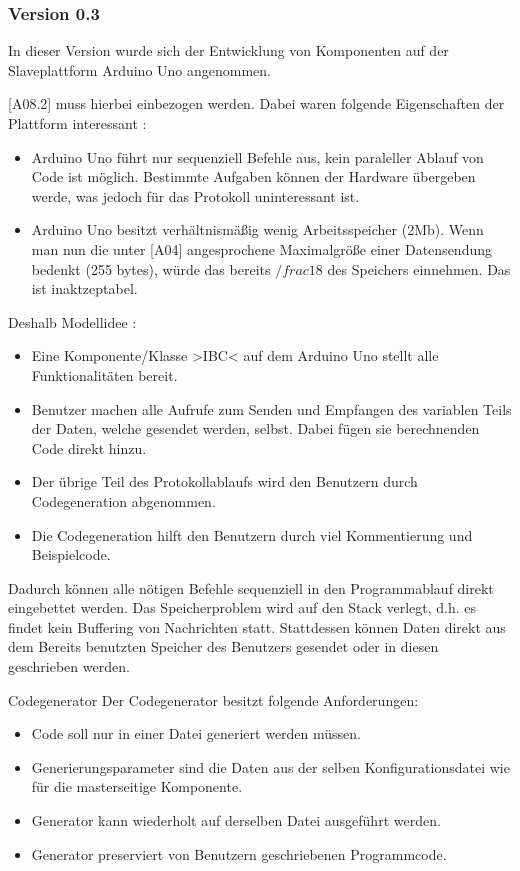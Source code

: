 \subsubsection{Version 0.3}

In dieser Version wurde sich der Entwicklung von Komponenten auf der Slaveplattform Arduino Uno angenommen.

[A08.2] muss hierbei einbezogen werden. Dabei waren folgende Eigenschaften der Plattform interessant : 
\begin{itemize}
	\item Arduino Uno führt nur sequenziell Befehle aus, kein paraleller Ablauf von Code ist möglich. Bestimmte Aufgaben können der Hardware übergeben werde, was jedoch für das Protokoll uninteressant ist.
	\item Arduino Uno besitzt verhältnismäßig wenig Arbeitsspeicher (2Mb). Wenn man nun die unter [A04] angesprochene Maximalgröße einer Datensendung bedenkt (255 bytes), würde das bereits $/frac{1}{8}$ des Speichers einnehmen. Das ist inaktzeptabel.
\end{itemize}

Deshalb Modellidee : 
\begin{itemize}
	\item Eine Komponente/Klasse >IBC< auf dem Arduino Uno stellt alle Funktionalitäten bereit.
	\item Benutzer machen alle Aufrufe zum Senden und Empfangen des variablen Teils der Daten, welche gesendet werden, selbst. Dabei fügen sie berechnenden Code direkt hinzu.
	\item Der übrige Teil des Protokollablaufs wird den Benutzern durch Codegeneration abgenommen.
	\item Die Codegeneration hilft den Benutzern durch viel Kommentierung und Beispielcode.
\end{itemize}

	Dadurch können alle nötigen Befehle sequenziell in den Programmablauf direkt eingebettet werden. Das Speicherproblem wird auf den Stack verlegt, d.h. es findet kein Buffering von Nachrichten statt. Stattdessen können Daten direkt aus dem Bereits benutzten Speicher des Benutzers gesendet oder in diesen geschrieben werden.


\Large Codegenerator
	Der Codegenerator besitzt folgende Anforderungen:
	\begin{itemize}
		\item Code soll nur in einer Datei generiert werden müssen.
		\item Generierungsparameter sind die Daten aus der selben Konfigurationsdatei wie für die masterseitige Komponente.
		\item Generator kann wiederholt auf derselben Datei ausgeführt werden.
		\item Generator preserviert von Benutzern geschriebenen Programmcode.
	\end{itemize}

